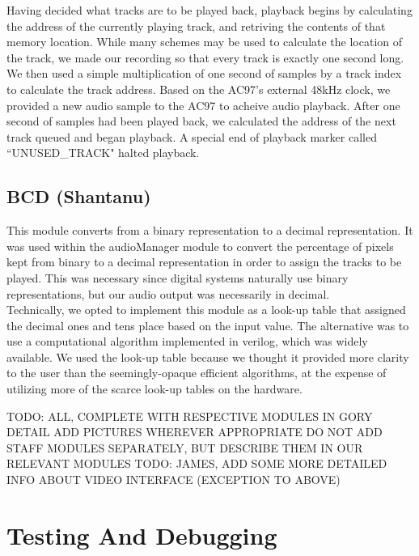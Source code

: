 \documentclass{article}
\begin{document}
Having decided what tracks are to be played back, playback begins by calculating the address of the currently playing track, and retriving the contents of that memory location. While many schemes may be used to calculate the location of the track, we made our recording so that every track is exactly one second long. We then used a simple multiplication of one second of samples by a track index to calculate the track address. Based on the AC97's external 48kHz clock, we provided a new audio sample to the AC97 to acheive audio playback. After one second of samples had been played back, we calculated the address of the next track queued and began playback. A special end of playback marker called ``UNUSED\_TRACK" halted playback. 

\subsection{BCD (Shantanu)}
This module converts from a binary representation to a decimal representation. It was used within the audioManager module to convert the percentage of pixels kept from binary to a decimal representation in order to assign the tracks to be played. This was necessary since digital systems naturally use binary representations, but our audio output was necessarily in decimal.
\\ Technically, we opted to implement this module as a look-up table that assigned the decimal ones and tens place based on the input value. The alternative was to use a computational algorithm implemented in verilog, which was widely available. We used the look-up table because we thought it provided more clarity to the user than the seemingly-opaque efficient algorithms, at the expense of utilizing more of the scarce look-up tables on the hardware. 

TODO: ALL, COMPLETE WITH RESPECTIVE MODULES IN GORY DETAIL
ADD PICTURES WHEREVER APPROPRIATE
DO NOT ADD STAFF MODULES SEPARATELY, BUT DESCRIBE THEM IN OUR RELEVANT MODULES
TODO: JAMES, ADD SOME MORE DETAILED INFO ABOUT VIDEO INTERFACE
(EXCEPTION TO ABOVE)

\section{Testing And Debugging}
\end{document}
